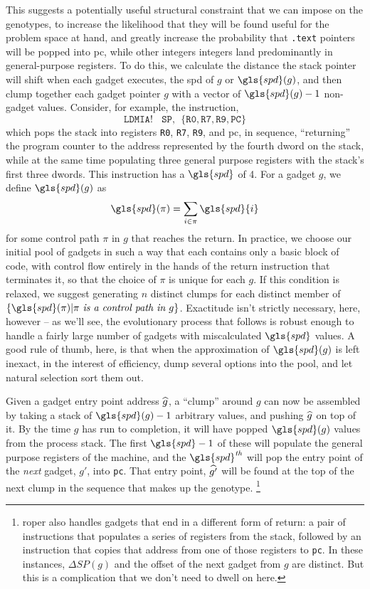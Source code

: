 \documentclass[12pt,glossary]{dalthesis}
\begin{document}
This suggests a potentially useful structural constraint that we can
impose on the genotypes, to increase the likelihood that they will be found
useful for the problem space at hand, and greatly increase the probability that
\texttt{.text} pointers will be popped into \gls{pc}, while other integers
integers land predominantly in general-purpose registers.
To do this, we calculate the distance the stack pointer will shift
when each gadget executes, the \gls{spd} of \(g\) or \(\gls{spd}(g)\), and then clump together
each gadget pointer \(g\) with a vector of \(\gls{spd}(g)-1\) non-gadget
values. Consider, for example, the instruction,
\[\mathtt{LDMIA!~~~~SP,~~\{R0, R7, R9, PC\}}\]
which pops the stack into registers \texttt{R0}, \texttt{R7}, \texttt{R9}, and \gls{pc}, in sequence,
``returning'' the program counter to the address represented by the fourth dword
on the stack, while at the same time populating three general purpose registers
with the stack's first three dwords. This instruction has a \(\gls{spd}\)
of 4. For a gadget \(g\), we define \(\gls{spd}(g)\) as 
$$\gls{spd}(\pi) = \sum_{i\in \pi} \gls{spd}{i}$$
for some control path \(\pi\) in \(g\) that reaches the return. In practice,
we choose our initial pool of gadgets in such a way that each contains only a basic
block of code, with control flow entirely in the hands of the return instruction
that terminates it, so that the choice of \(\pi\) is unique for each \(g\). If this
condition is relaxed, we suggest generating \(n\) distinct clumps for each
distinct member of \(\{\gls{spd}(\pi)|\pi \textit{ is a control path in } g\}\).
Exactitude isn't strictly necessary, here, however -- as we'll see, the
evolutionary process that follows is robust enough to handle a fairly large
number of gadgets with miscalculated \(\gls{spd}\) values. A good rule of thumb,
here, is that when the approximation of \(\gls{spd}(g)\) is left inexact, in the
interest of efficiency, dump several options into the pool, and let natural
selection sort them out.

Given a gadget entry point address \(\widehat{g}\), a ``clump'' around \(g\) can now be
assembled by taking a stack of \(\gls{spd}(g)-1\) arbitrary values, and pushing
\(\widehat{g}\) on top of it. By the time \(g\) has run to completion, it will have popped
\(\gls{spd}(g)\) values from the process stack. The first \(\gls{spd}-1\) of
these will populate the general purpose registers of the machine, and the
\({\gls{spd}}^{\textit{th}}\) will pop the entry point of the \emph{next} gadget,
\(g'\), into \texttt{pc}. That entry point, \(\widehat{g'}\) will be found at the top of the
next clump in the sequence that makes up the genotype.
  \footnote{\gls{roper} also handles gadgets that end in a different form of
  return: a pair of instructions that populates a series of registers
  from the stack, followed by an instruction that copies that address
  from one of those registers to \texttt{pc}. In these instances,
  \(\Delta{SP}(g)\) and the offset of the next gadget from \(g\) are
  distinct. But this is a complication that we don't need to dwell on
  here.}
\end{document}
